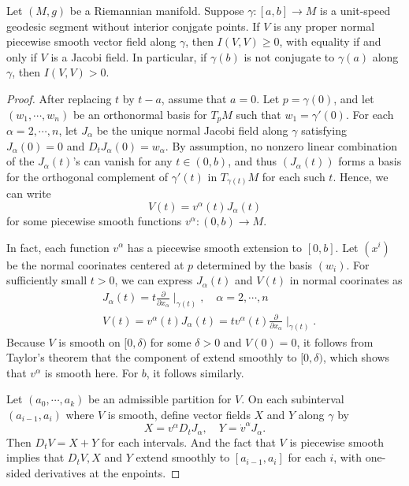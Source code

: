 \begin{theorem}
  \label{theorem-index-form-greater-than-or-equal-to-0}
  Let \( (M, g) \) be a Riemannian manifold.
  Suppose \( \gamma: [a, b] \to M \) is a unit-speed geodesic segment without interior conjgate points.
  If \( V \) is any proper normal piecewise smooth vector field along \( \gamma \), then \( I(V, V) \geq 0 \), with equality if and only if \( V \) is a Jacobi field.
  In particular, if \( \gamma(b) \) is not conjugate to \( \gamma(a) \) along \( \gamma \), then \( I(V, V) > 0 \).
\end{theorem}
\begin{proof}
  After replacing \( t \) by \( t - a \), assume that \( a = 0 \).
  Let \( p = \gamma(0) \), and let \( (w_1, \cdots, w_n) \) be an orthonormal basis for \( T_p M \) such that \( w_1 = \gamma'(0) \).
  For each \( \alpha = 2, \cdots, n \), let \( J_\alpha \) be the unique normal Jacobi field along \( \gamma \) satisfying \( J_\alpha(0) = 0 \) and \( D_t J_\alpha(0) = w_\alpha \).
  By assumption, no nonzero linear combination of the \( J_\alpha(t) \)'s can vanish for any \( t \in (0, b) \), and thus \( (J_\alpha(t)) \) forms a basis for the orthogonal complement of \( \gamma'(t) \) in \( T_{\gamma(t)} M \) for each such \( t \).
  Hence, we can write
  \[
    V(t) = v^\alpha(t) J_\alpha(t)
  \]
  for some piecewise smooth functions \( v^\alpha: (0, b) \to M \).

  In fact, each function \( v^\alpha \) has a piecewise smooth extension to \( [0, b] \).
  Let \( (x^i) \) be the normal coorinates centered at \( p \) determined by the basis \( (w_i) \).
  For sufficiently small \( t > 0 \), we can express \( J_\alpha(t) \) and \( V(t) \) in normal coorinates as
  \begin{align*}
    &J_\alpha(t) = t \frac{\partial}{\partial x_\alpha} \mid_{\gamma(t)},\quad \alpha = 2, \cdots, n\\
    &V(t) = v^\alpha (t) J_\alpha(t) = t v^\alpha(t) \frac{\partial}{\partial x_\alpha} \mid_{\gamma(t)}.
  \end{align*}
  Because \( V \) is smooth on \( [0, \delta) \) for some \( \delta > 0 \) and \( V(0) = 0 \), it follows from Taylor's theorem that the component of extend smoothly to \( [0, \delta) \), which shows that \( v^\alpha \) is smooth here.
  For \( b \), it follows similarly.

  Let \( (a_0, \cdots, a_k) \) be an admissible partition for \( V \).
  On each subinterval \( (a_{i - 1}, a_i) \) where \( V \) is smooth, define vector fields \( X \) and \( Y \) along \( \gamma \) by
  \[
    X = v^\alpha D_t J_\alpha,\quad Y = \dot{v}^\alpha J_\alpha.
  \]
  Then \( D_t V = X + Y \) for each intervals.
  And the fact that \( V \) is piecewise smooth implies that \( D_t V, X \) and \( Y \) extend smoothly to \( [a_{i - 1}, a_i] \) for each \( i \), with one-sided derivatives at the enpoints.


\end{proof}
